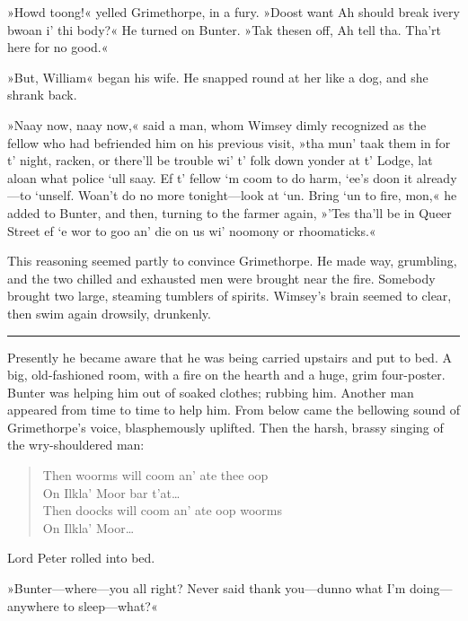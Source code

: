  »Howd toong!« yelled Grimethorpe, in a fury. »Doost want Ah should break ivery bwoan i' thi body?« He turned on Bunter. »Tak thesen off, Ah tell tha. Tha'rt here for no good.«

»But, William\longdash« began his wife. He snapped round at her like a dog, and she shrank back.

»Naay now, naay now,« said a man, whom Wimsey dimly recognized as the fellow who had befriended him on his previous visit, »tha mun' taak them in for t' night, racken, or there'll be trouble wi' t' folk down yonder at t' Lodge, lat aloan what police `ull saay. Ef t' fellow `m coom to do harm, `ee's doon it already—to `unself. Woan't do no more tonight—look at `un. Bring `un to fire, mon,« he added to Bunter, and then, turning to the farmer again, »'Tes tha'll be in Queer Street ef `e wor to goo an' die on us wi' noomony or rhoomaticks.«

This reasoning seemed partly to convince Grimethorpe. He made way, grumbling, and the two chilled and exhausted men were brought near the fire. Somebody brought two large, steaming tumblers of spirits.  Wimsey's brain seemed to clear, then swim again drowsily, drunkenly. 

\noindent\hfil\rule{0.5\textwidth}{.4pt}\hfil 

Presently he became aware that he was being carried upstairs and put to bed. A big, old-fashioned room, with a fire on the hearth and a huge, grim four-poster. Bunter was helping him out of soaked clothes; rubbing him. Another man appeared from time to time to help him. From below came the bellowing sound of Grimethorpe's voice, blasphemously uplifted. Then the harsh, brassy singing of the wry-shouldered man: 

\clearpage

\begin{verse}
\begin{altverse}
Then woorms will coom an' ate thee oop\\
On Ilkla' Moor bar t'at\dots\\
Then doocks will coom an' ate oop woorms\\
On Ilkla' Moor\dots\\
\end{altverse}
\end{verse}


Lord Peter rolled into bed.

»Bunter—where—you all right? Never said thank you—dunno what I'm doing—anywhere to sleep—what?«

